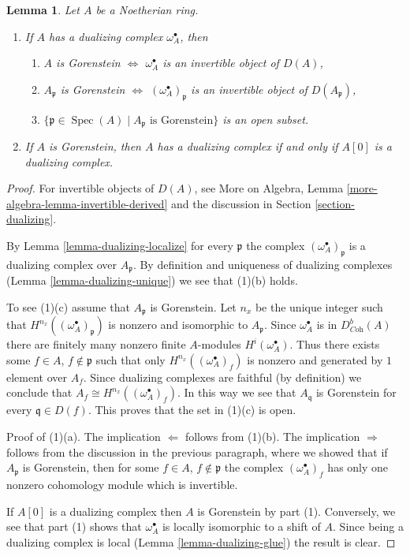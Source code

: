 \documentclass[10pt,a4paper]{amsart}
\theoremstyle{plain}
\newtheorem{lemma}[subsection]{Lemma}
\theoremstyle{definition}
\theoremstyle{remark}
\numberwithin{equation}{subsection}
\def\Spec{\mathop{\mathrm{Spec}}}
\begin{document}
\begin{lemma}
\label{lemma-gorenstein}
Let $A$ be a Noetherian ring.
\begin{enumerate}
\item If $A$ has a dualizing complex $\omega_A^\bullet$, then
\begin{enumerate}
\item $A$ is Gorenstein $\Leftrightarrow$ $\omega_A^\bullet$ is an invertible
object of $D(A)$,
\item $A_\mathfrak p$ is Gorenstein $\Leftrightarrow$
$(\omega_A^\bullet)_\mathfrak p$ is an invertible object of
$D(A_\mathfrak p)$,
\item $\{\mathfrak p \in \Spec(A) \mid A_\mathfrak p\text{ is Gorenstein}\}$
is an open subset.
\end{enumerate}
\item If $A$ is Gorenstein, then $A$ has a dualizing complex if and
only if $A[0]$ is a dualizing complex.
\end{enumerate}
\end{lemma}

\begin{proof}
For invertible objects of $D(A)$, see
More on Algebra, Lemma \ref{more-algebra-lemma-invertible-derived}
and the discussion in Section \ref{section-dualizing}.

\medskip\noindent
By Lemma \ref{lemma-dualizing-localize} for every
$\mathfrak p$ the complex $(\omega_A^\bullet)_\mathfrak p$ is a
dualizing complex over $A_\mathfrak p$. By definition and uniqueness
of dualizing complexes (Lemma \ref{lemma-dualizing-unique})
we see that (1)(b) holds.

\medskip\noindent
To see (1)(c) assume that $A_\mathfrak p$ is Gorenstein.
Let $n_x$ be the unique integer such that
$H^{n_{x}}((\omega_A^\bullet)_\mathfrak p)$
is nonzero and isomorphic to $A_\mathfrak p$.
Since $\omega_A^\bullet$ is in $D^b_{\textit{Coh}}(A)$
there are finitely many nonzero finite $A$-modules
$H^i(\omega_A^\bullet)$. Thus there exists some
$f \in A$, $f \not \in \mathfrak p$
such that only $H^{n_x}((\omega_A^\bullet)_f)$
is nonzero and generated by $1$ element over $A_f$.
Since dualizing complexes are faithful (by definition)
we conclude that $A_f \cong H^{n_x}((\omega_A^\bullet)_f)$.
In this way we see that $A_\mathfrak q$ is Gorenstein
for every $\mathfrak q \in D(f)$. This proves that the set
in (1)(c) is open.

\medskip\noindent
Proof of (1)(a). The implication $\Leftarrow$ follows from (1)(b).
The implication $\Rightarrow$ follows from the discussion
in the previous paragraph, where we showed that if $A_\mathfrak p$
is Gorenstein, then for some $f \in A$, $f \not \in \mathfrak p$
the complex $(\omega_A^\bullet)_f$ has only one nonzero cohomology module
which is invertible.

\medskip\noindent
If $A[0]$ is a dualizing complex then $A$ is Gorenstein by
part (1). Conversely, we see that part (1) shows that
$\omega_A^\bullet$ is locally isomorphic to a shift of $A$.
Since being a dualizing complex is local
(Lemma \ref{lemma-dualizing-glue})
the result is clear.
\end{proof}
\end{document}
